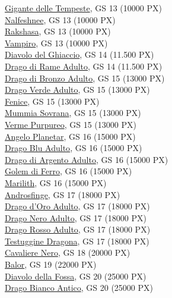 \begin{multicols}{3}
{\hyperlink{Gigante delle Tempeste}{Gigante delle Tempeste}, GS 13 (10000 PX)\\
\hyperlink{Nalfeshnee}{Nalfeshnee}, GS 13 (10000 PX)\\
\hyperlink{Rakshasa}{Rakshasa}, GS 13 (10000 PX)\\
\hyperlink{Vampiro}{Vampiro}, GS 13 (10000 PX)\\
\hyperlink{Diavolo del Ghiaccio}{Diavolo del Ghiaccio}, GS 14 (11.500 PX)\\
\hyperlink{Drago di Rame Adulto}{Drago di Rame Adulto}, GS 14 (11.500 PX)\\
\hyperlink{Drago di Bronzo Adulto}{Drago di Bronzo Adulto}, GS 15 (13000 PX)\\
\hyperlink{Drago Verde Adulto}{Drago Verde Adulto}, GS 15 (13000 PX)\\
\hyperlink{Fenice}{Fenice}, GS 15 (13000 PX)\\
\hyperlink{Mummia Sovrana}{Mummia Sovrana}, GS 15 (13000 PX)\\
\hyperlink{Verme Purpureo}{Verme Purpureo}, GS 15 (13000 PX)\\
\hyperlink{Angelo Planetar}{Angelo Planetar}, GS 16 (15000 PX)\\
\hyperlink{Drago Blu Adulto}{Drago Blu Adulto}, GS 16 (15000 PX)\\
\hyperlink{Drago di Argento Adulto}{Drago di Argento Adulto}, GS 16 (15000 PX)\\
\hyperlink{Golem di Ferro}{Golem di Ferro}, GS 16 (15000 PX)\\
\hyperlink{Marilith}{Marilith}, GS 16 (15000 PX)\\
\hyperlink{Androsfinge}{Androsfinge}, GS 17 (18000 PX)\\
\hyperlink{Drago d'Oro Adulto}{Drago d'Oro Adulto}, GS 17 (18000 PX)\\
\hyperlink{Drago Nero Adulto}{Drago Nero Adulto}, GS 17 (18000 PX)\\
\hyperlink{Drago Rosso Adulto}{Drago Rosso Adulto}, GS 17 (18000 PX)\\
\hyperlink{Testuggine Dragona}{Testuggine Dragona}, GS 17 (18000 PX)\\
\hyperlink{Cavaliere Nero}{Cavaliere Nero}, GS 18 (20000 PX)\\
\hyperlink{Balor}{Balor}, GS 19 (22000 PX)\\
\hyperlink{Diavolo della Fossa}{Diavolo della Fossa}, GS 20 (25000 PX)\\
\hyperlink{Drago Bianco Antico}{Drago Bianco Antico}, GS 20 (25000 PX)\\
}
\end{multicols}
